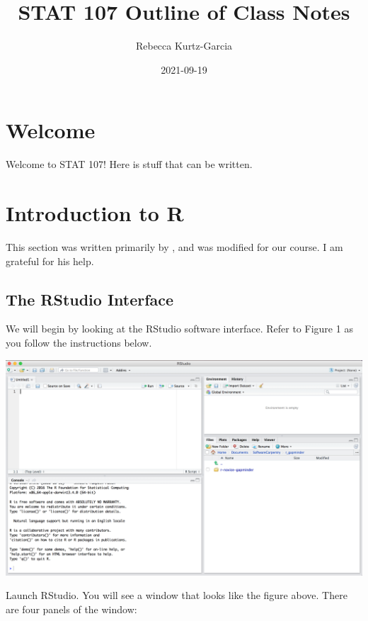 \documentclass[
]{book}
\title{STAT 107 Outline of Class Notes}
\author{Rebecca Kurtz-Garcia}
\date{2021-09-19}
\begin{document}
\maketitle

{
\setcounter{tocdepth}{1}
\tableofcontents
}
\hypertarget{welcome}{%
\chapter*{Welcome}\label{welcome}}

Welcome to STAT 107! Here is stuff that can be written.

\hypertarget{introduction-to-r}{%
\chapter{Introduction to R}\label{introduction-to-r}}

This section was written primarily by \citet{Desharnais2020}, and was modified for our course. I am grateful for his help.

\hypertarget{the-rstudio-interface}{%
\section{\texorpdfstring{The \textbf{RStudio} Interface}{The RStudio Interface}}\label{the-rstudio-interface}}

We will begin by looking at the RStudio software interface. Refer to Figure 1 as you follow the instructions below.

\includegraphics[width=35.53in]{images/rstudio}

Launch RStudio. You will see a window that looks like the figure above. There are four panels of the window:
\end{document}

